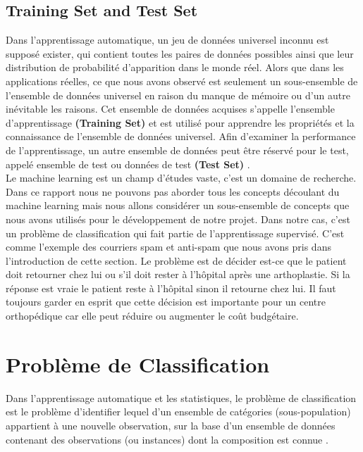 \documentclass[12pt, french]{report}
\begin{document}
\subsection{Training Set and Test Set}
Dans l'apprentissage automatique, un jeu de données universel inconnu est supposé exister, qui contient toutes les paires de données possibles ainsi que leur distribution de probabilité d'apparition dans le monde réel. Alors que dans les applications réelles, ce que nous avons observé est seulement un sous-ensemble de l'ensemble de données universel en raison du manque de mémoire ou d'un autre inévitable les raisons. Cet ensemble de données acquises s'appelle l'ensemble d'apprentissage \textbf{(Training Set)} et est utilisé pour apprendre les propriétés et la connaissance de l'ensemble de données universel. Afin d'examiner la performance de l'apprentissage, un autre ensemble de données peut être réservé pour le test, appelé ensemble de test ou données de test \textbf{(Test Set)} \cite{key15}.\\


Le machine learning est un champ d'études vaste, c'est un domaine de recherche. Dans ce rapport nous ne pouvons pas aborder tous les concepts découlant du machine learning mais nous allons considérer un sous-ensemble de concepts que nous avons utilisés pour le développement de notre projet. Dans notre cas, c'est un problème de classification qui fait partie de l'apprentissage supervisé. C'est comme l'exemple des courriers spam et anti-spam que nous avons pris dans l'introduction de cette section. Le problème est de décider est-ce que le patient doit retourner chez lui ou s'il doit rester à l'hôpital après une arthoplastie. Si la réponse est vraie le patient reste à l'hôpital sinon il retourne chez lui. Il faut toujours garder en esprit que cette décision est importante pour un centre orthopédique car elle peut réduire ou augmenter le coût budgétaire.   

\section{Problème de Classification}

Dans l'apprentissage automatique et les statistiques, le problème de classification est le problème d'identifier lequel d'un ensemble de catégories (sous-population) appartient à une nouvelle observation, sur la base d'un ensemble de données contenant des observations (ou instances) dont la composition est connue \cite{key16}.\\
\end{document}

